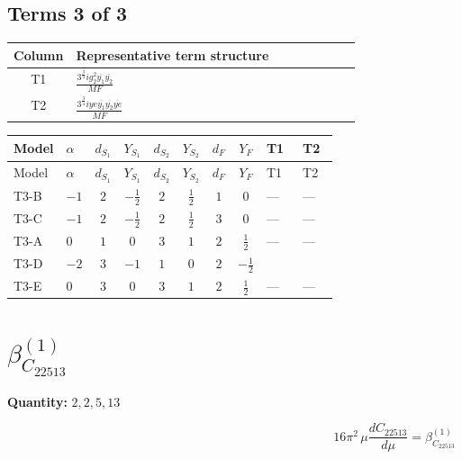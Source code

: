 \documentclass[8pt]{article}
\begin{document}
\begin{landscape}
\subsection*{Terms 3 of 3}
\begin{center}
\begin{tabular}{@{}c >{\raggedright\arraybackslash}p{0.82\linewidth}@{}}
\toprule
Column & Representative term structure \\
\midrule
T1 & \(\displaystyle \frac{3^{\frac{3}{4}} i g_{2}^{2} \overline{y_{1}} \overline{y_{2}}}{MF}\) \\
\midrule
T2 & \(\displaystyle \frac{3^{\frac{3}{4}} i ye \overline{y_{1}} \overline{y_{2}} \overline{ye}}{MF}\) \\
\midrule
\bottomrule
\end{tabular}
\end{center}
\smallskip
\tiny
\begin{longtable}{@{}llcccccc >{\raggedright\arraybackslash}p{0.21\linewidth} >{\raggedright\arraybackslash}p{0.21\linewidth}@{}}
\toprule
Model & $\alpha$ & $d_{S_1}$ & $Y_{S_1}$ & $d_{S_2}$ & $Y_{S_2}$ & $d_F$ & $Y_F$ & T1 & T2 \\
\midrule
\endfirsthead
\toprule
Model & $\alpha$ & $d_{S_1}$ & $Y_{S_1}$ & $d_{S_2}$ & $Y_{S_2}$ & $d_F$ & $Y_F$ & T1 & T2 \\
\midrule
\endhead
T3-B & $-1$ & $2$ & $-\frac{1}{2}$ & $2$ & $\frac{1}{2}$ & $1$ & $0$ & --- & --- \\
\midrule
T3-C & $-1$ & $2$ & $-\frac{1}{2}$ & $2$ & $\frac{1}{2}$ & $3$ & $0$ & --- & --- \\
\midrule
T3-A & $0$ & $1$ & $0$ & $3$ & $1$ & $2$ & $\frac{1}{2}$ & --- & --- \\
\midrule
T3-D & $-2$ & $3$ & $-1$ & $1$ & $0$ & $2$ & $-\frac{1}{2}$ & \scriptsize\adjustbox{max width=\linewidth}{$\begin{gathered} \frac{11 \cdot 3^{\frac{3}{4}} i g_{2}^{2} \overline{y_{1}} \overline{y_{2}}}{8 MF}\end{gathered}$} & \scriptsize\adjustbox{max width=\linewidth}{$\begin{gathered} - \frac{3^{\frac{3}{4}} i ye \overline{y_{1}} \overline{y_{2}} \overline{ye}}{12 MF}\end{gathered}$} \\
\midrule
T3-E & $0$ & $3$ & $0$ & $3$ & $1$ & $2$ & $\frac{1}{2}$ & --- & --- \\
\midrule
\bottomrule
\end{longtable}
\clearpage
\section*{$\beta_{C_{22513}}^{(1)}$}
\noindent\textbf{Quantity: }$\mathrm{2,2,5,13}$\par\smallskip
\[16\pi^2\,\mu\frac{d C_{22513}}{d\mu}=\beta_{C_{22513}}^{(1)}\]

\end{landscape}
\end{document}
